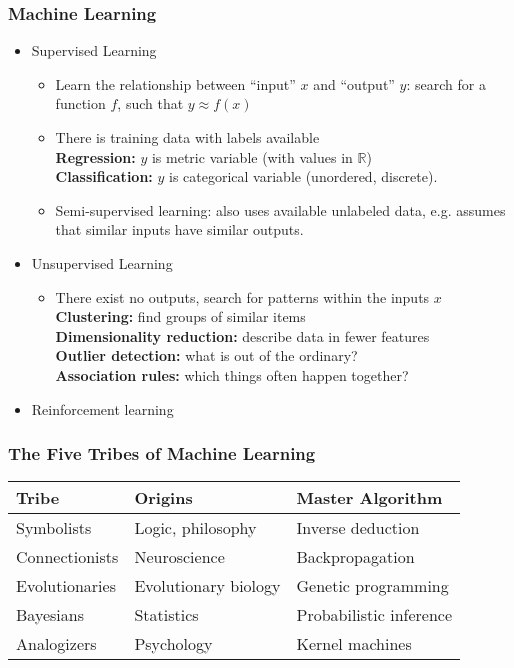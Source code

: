 \documentclass[UTF8,11pt,colorlinks,compress,openany]{beamer}%
\begin{document}
\begin{frame}\frametitle{Machine Learning}
\begin{itemize}
	\item Supervised Learning
		\begin{itemize}
			\item Learn the relationship between ``input'' $x$ and ``output'' $y$: search for a function $f$, such that $y\approx f(x)$
			\item There is training data with labels available\\
			\textbf{Regression:} $y$ is metric variable (with values in $\mathbb{R}$)\\
			\textbf{Classification:} $y$ is categorical variable (unordered, discrete).
			\item Semi-supervised learning: also uses available unlabeled data, e.g. assumes that similar inputs have similar outputs.
		\end{itemize}
	\item Unsupervised Learning
		\begin{itemize}
			\item There exist no outputs, search for patterns within the inputs $x$\\
			\textbf{Clustering:} find groups of similar items\\
			\textbf{Dimensionality reduction:} describe data in fewer features\\
			\textbf{Outlier detection:} what is out of the ordinary?\\
			\textbf{Association rules:} which things often happen together?
		\end{itemize}
	\item Reinforcement learning
\end{itemize}
\end{frame}

\begin{frame}\frametitle{The Five Tribes of Machine Learning}
\begin{table}
\begin{tabu}{l|l|l}
\hline
\textbf{Tribe} &\textbf{Origins} &\textbf{Master Algorithm}\\
\hline
Symbolists &Logic, philosophy &Inverse deduction\\
\hline
Connectionists &Neuroscience &Backpropagation\\
\hline
Evolutionaries &Evolutionary biology &Genetic programming\\
\hline
Bayesians &Statistics &Probabilistic inference\\
\hline
Analogizers &Psychology &Kernel machines\\
\hline
\end{tabu}
\end{table}
\end{frame}
\end{document}
